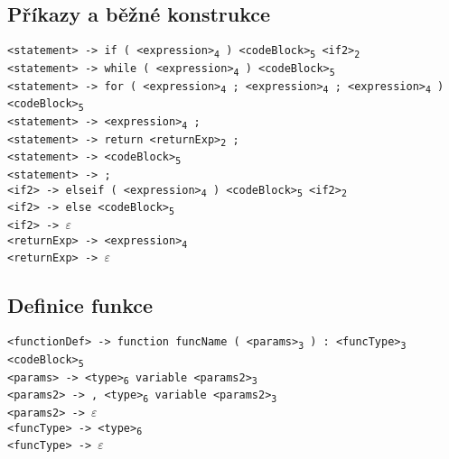 \documentclass[a4paper]{article}
\begin{document}
\subsection*{Příkazy a běžné konstrukce}
\texttt{<statement> -> if ( <expression>\textsubscript{4} ) <codeBlock>\textsubscript{5} <if2>\textsubscript{2}} \\
\texttt{<statement> -> while ( <expression>\textsubscript{4} ) <codeBlock>\textsubscript{5}} \\
\texttt{<statement> -> for ( <expression>\textsubscript{4} ; <expression>\textsubscript{4} ; <expression>\textsubscript{4} ) <codeBlock>\textsubscript{5}} \\
\texttt{<statement> -> <expression>\textsubscript{4} ;} \\
\texttt{<statement> -> return <returnExp>\textsubscript{2} ;}\\
\texttt{<statement> -> <codeBlock>\textsubscript{5}}\\
\texttt{<statement> -> ;}\\[1em]
\texttt{<if2> -> elseif ( <expression>\textsubscript{4} ) <codeBlock>\textsubscript{5} <if2>\textsubscript{2}}\\
\texttt{<if2> -> else <codeBlock>\textsubscript{5}}\\
\texttt{<if2> -> }$\varepsilon$\\[1em]
\texttt{<returnExp> -> <expression>\textsubscript{4}}\\
\texttt{<returnExp> -> $\varepsilon$}

\subsection*{Definice funkce}
\texttt{<functionDef> -> function funcName ( <params>\textsubscript{3} ) : <funcType>\textsubscript{3} <codeBlock>\textsubscript{5}} \\[1em]
\texttt{<params> -> <type>\textsubscript{6} variable <params2>\textsubscript{3}} \\[1em]
\texttt{<params2> -> , <type>\textsubscript{6} variable <params2>\textsubscript{3}}\\
\texttt{<params2> -> $\varepsilon$}\\[1em]
\texttt{<funcType> -> <type>\textsubscript{6}}\\
\texttt{<funcType> -> $\varepsilon$}
\end{document}
